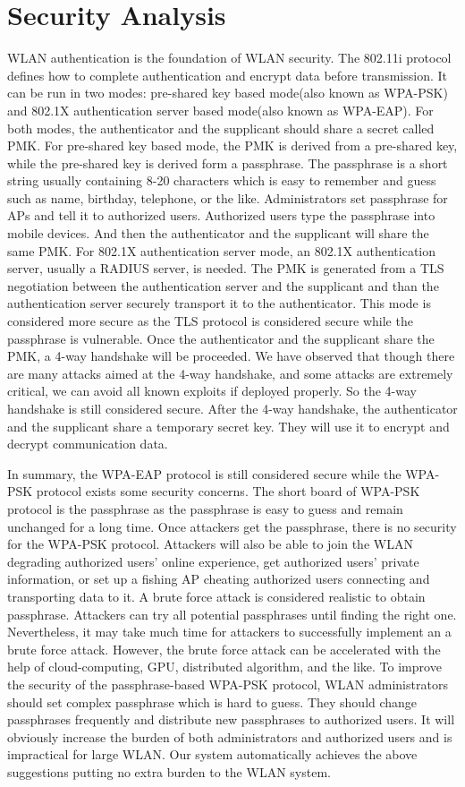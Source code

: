 \section{Security Analysis}
WLAN authentication is the foundation of WLAN security. The 802.11i protocol defines how to complete authentication and encrypt data before transmission. It can be run in two modes: pre-shared key based mode(also known as WPA-PSK) and 802.1X authentication server based mode(also known as WPA-EAP). For both modes, the authenticator and the supplicant should share a secret called PMK. For pre-shared key based mode, the PMK is derived from a pre-shared key, while the pre-shared key is derived form a passphrase. The passphrase is a short string usually containing 8-20 characters which is easy to remember and guess such as name, birthday, telephone, or the like. Administrators set passphrase for APs and tell it to authorized users. Authorized users type the passphrase into mobile devices. And then the authenticator and the supplicant will share the same PMK. For 802.1X authentication server mode, an 802.1X authentication server, usually a RADIUS server, is needed. The PMK is generated from a TLS negotiation between the authentication server and the supplicant and than the authentication server securely transport it to the authenticator. This mode is considered more secure as the TLS protocol is considered secure while the passphrase is vulnerable. Once the authenticator and the supplicant share the PMK, a 4-way handshake will be proceeded. We have observed that though there are many attacks aimed at the 4-way handshake, and some attacks are extremely critical, we can avoid all known exploits if deployed properly. So the 4-way handshake is still considered secure. After the 4-way handshake, the authenticator and the supplicant share a temporary secret key. They will use it to encrypt and decrypt communication data. 

In summary, the WPA-EAP protocol is still considered secure while the WPA-PSK protocol exists some security concerns. The short board of WPA-PSK protocol is the passphrase as the passphrase is easy to guess and remain unchanged for a long time. Once attackers get the passphrase, there is no security for the WPA-PSK protocol. Attackers will also be able to join the WLAN degrading authorized users’ online experience, get authorized users’ private information, or set up a fishing AP cheating authorized users connecting and transporting data to it. A brute force attack is considered realistic to obtain passphrase. Attackers can try all potential passphrases until finding the right one. Nevertheless, it may take much time for attackers to successfully implement an a brute force attack. However, the brute force attack can be accelerated with the help of cloud-computing, GPU, distributed algorithm, and the like. To improve the security of the passphrase-based WPA-PSK protocol, WLAN administrators should set complex passphrase which is hard to guess. They should change passphrases frequently and distribute new passphrases to authorized users. It will obviously increase the burden of both administrators and authorized users and is impractical for large WLAN. Our system automatically achieves the above suggestions putting no extra burden to the WLAN system. 


